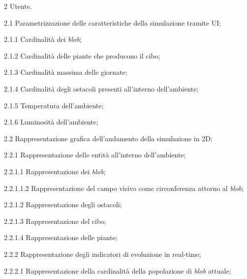 \begin{myEnumerate}
    \item[2] Utente.
    \begin{myEnumerate}[label*=\arabic*.]
		\label{sec:2.1}
        \item[2.1] Parametrizzazione delle caratteristiche della simulazione tramite UI;
        \begin{myEnumerate}[label*=\arabic*.]
            \item[2.1.1] Cardinalità dei \textit{blob};
            \item[2.1.2] Cardinalità delle piante che producono il cibo;
            \item[2.1.3] Cardinalità massima delle giornate;
            \item[2.1.4] Cardinalità degli ostacoli presenti all'interno dell'ambiente;
            \item[2.1.5] Temperatura dell'ambiente;
            \item[2.1.6] Luminosità dell'ambiente;
        \end{myEnumerate}
        \item[2.2] Rappresentazione grafica dell'andamento della simulazione in 2D;
        \begin{myEnumerate}[label*=\arabic*.]
		\label{sec:2.2.1}
            \item[2.2.1] Rappresentazione delle entità all'interno dell'ambiente;
            \begin{myEnumerate}[label*=\arabic*.]
                \item[2.2.1.1] Rappresentazione dei \textit{blob};
		        \begin{myEnumerate}[label*=\arabic*.]
			        \item[2.2.1.1.2] Rappresentazione del campo visivo come circonferenza attorno al \textit{blob};
		        \end{myEnumerate}
                \item[2.2.1.2] Rappresentazione degli ostacoli;
                \item[2.2.1.3] Rappresentazione del cibo;
		\item[2.2.1.4] Rappresentazione delle piante;
            \end{myEnumerate}
		\label{sec:2.2.2}
            \item[2.2.2] Rappresentazione degli indicatori di evoluzione in real-time;
            \begin{myEnumerate}[label*=\arabic*.]
                \item[2.2.2.1] Rappresentazione della cardinalità della popolazione di \textit{blob} attuale;

\end{myEnumerate}
\end{myEnumerate}
\end{myEnumerate}
\end{myEnumerate}
